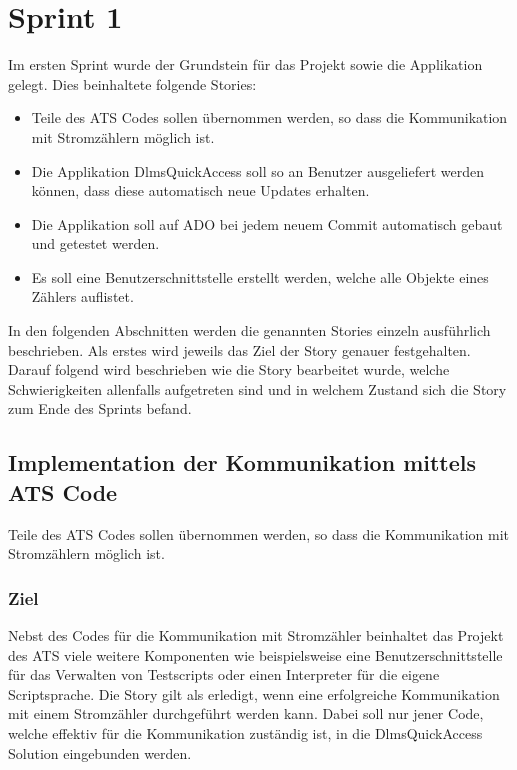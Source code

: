 \section{Sprint 1}
Im ersten Sprint wurde der Grundstein für das Projekt sowie die Applikation gelegt.
Dies beinhaltete folgende Stories:
\begin{itemize}
   \item Teile des \ac{ATS} Codes sollen übernommen werden, so dass die Kommunikation mit Stromzählern möglich ist.
   \item Die Applikation DlmsQuickAccess soll so an Benutzer ausgeliefert werden können, dass diese automatisch neue Updates erhalten.
   \item Die Applikation soll auf \ac{ADO} bei jedem neuem Commit automatisch gebaut und getestet werden. 
   \item Es soll eine Benutzerschnittstelle erstellt werden, welche alle Objekte eines Zählers auflistet.
\end{itemize}
In den folgenden Abschnitten werden die genannten Stories einzeln ausführlich beschrieben.
Als erstes wird jeweils das Ziel der Story genauer festgehalten.
Darauf folgend wird beschrieben wie die Story bearbeitet wurde, welche Schwierigkeiten allenfalls aufgetreten sind und in welchem Zustand sich die Story zum Ende des Sprints befand.

\subsection{Implementation der Kommunikation mittels ATS Code}\label{s1:ats}
\dq Teile des \ac{ATS} Codes sollen übernommen werden, so dass die Kommunikation mit Stromzählern möglich ist.\dq

\subsubsection{Ziel}
Nebst des Codes für die Kommunikation mit Stromzähler beinhaltet das Projekt des \ac{ATS} viele weitere Komponenten wie beispielsweise eine Benutzerschnittstelle für das Verwalten von Testscripts oder einen Interpreter für die eigene Scriptsprache.
Die Story gilt als erledigt, wenn eine erfolgreiche Kommunikation mit einem Stromzähler durchgeführt werden kann.
Dabei soll nur jener Code, welche effektiv für die Kommunikation zuständig ist, in die DlmsQuickAccess Solution eingebunden werden. 


